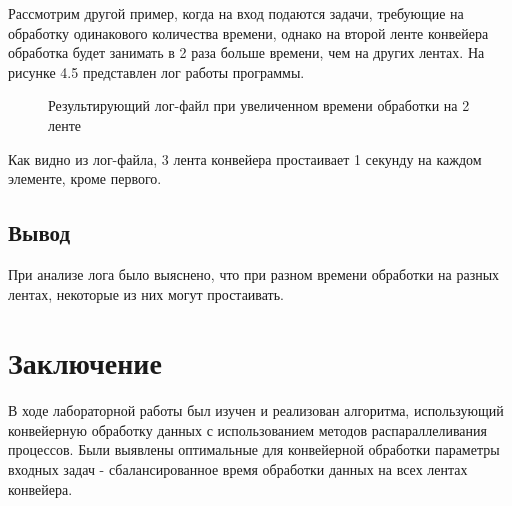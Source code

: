 \documentclass[a4paper,12pt]{report}
\begin{document}
Рассмотрим другой пример, когда на вход подаются задачи, требующие на обработку одинакового количества времени, однако на второй ленте конвейера обработка будет занимать в 2 раза больше времени, чем на других лентах. На рисунке 4.5 представлен лог работы программы.

\begin{figure}[ht!]
\caption{Результирующий лог-файл при увеличенном времени обработки на 2 ленте}
\end{figure}

Как видно из лог-файла, 3 лента конвейера простаивает 1 секунду на каждом элементе, кроме первого.

\section{Вывод}
\hspace{0.6cm} При анализе лога было выяснено, что при разном времени обработки на разных лентах, некоторые из них могут простаивать.

\newpage
\chapter*{Заключение}
\hspace{0.6cm}В ходе лабораторной работы был изучен и реализован алгоритма, использующий конвейерную обработку данных с использованием методов распараллеливания процессов. Были выявлены оптимальные для конвейерной обработки параметры входных задач - сбалансированное время обработки данных на всех лентах конвейера.    
\end{document}
